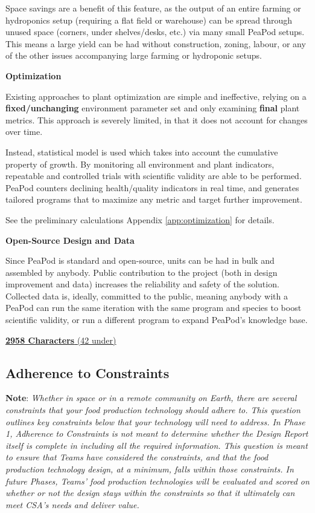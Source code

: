 \documentclass{report}
\begin{document}
Space savings are a benefit of this feature, as the output of an entire farming or hydroponics setup (requiring a flat field or warehouse) can be spread through unused space (corners, under shelves/desks, etc.) via many small PeaPod setups. This means a large yield can be had without construction, zoning, labour, or any of the other issues accompanying large farming or hydroponic setups.

\textbf{Optimization}

Existing approaches to plant optimization are simple and ineffective, relying on a \textbf{fixed/unchanging} environment parameter set and only examining \textbf{final} plant metrics. This approach is severely limited, in that it does not account for changes over time.

Instead, statistical model is used which takes into account the cumulative property of growth. By monitoring all environment and plant indicators, repeatable and controlled trials with scientific validity are able to be performed. PeaPod counters declining health/quality indicators in real time, and generates tailored programs that to maximize any metric and target further improvement.

See the preliminary calculations Appendix \ref{app:optimization} for details.

\textbf{Open-Source Design and Data}

Since PeaPod is standard and open-source, units can be had in bulk and assembled by anybody. Public contribution to the project (both in design improvement and data) increases the reliability and safety of the solution. Collected data is, ideally, committed to the public, meaning anybody with a PeaPod can run the same iteration with the same program and species to boost scientific validity, or run a different program to expand PeaPod's knowledge base.

\uline{\textbf{2958 Characters} (42 under)}

\vspace{0.5cm}

\subsection{Adherence to Constraints}
\label{sec:constraints}

\textbf{Note}: \textit{Whether in space or in a remote community on Earth, there are several constraints that your food production technology should adhere to. This question outlines key constraints below that your technology will need to address. In Phase 1, Adherence to Constraints is not meant to determine whether the Design Report itself is complete in including all the required information. This question is meant to ensure that Teams have considered the constraints, and that the food production technology design, at a minimum, falls within those constraints. In future Phases, Teams’ food production technologies will be evaluated and scored on whether or not the design stays within the constraints so that it ultimately can meet CSA’s needs and deliver value.}
\end{document}
